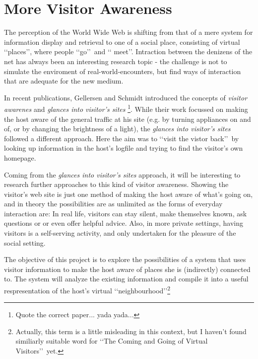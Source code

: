 \documentclass[a4paper]{danarticle}
\begin{document}
  \section*{More Visitor Awareness}
    The perception of the World Wide Web is shifting from that of a mere system
    for information display and retrieval to one of a social place, consisting
    of virtual \lq\lq places\rq\rq , where people \lq\lq go\rq\rq\ and \lq\lq
    meet\rq\rq . Intraction between the denizens of the net has always been an
    interesting research topic - the challenge is not to simulate the enviroment
    of real-world-encounters, but find ways of interaction that are adequate for
    the new medium.
    
    In recent publications, Gellersen and Schmidt introduced the concepts of
    \textit{visitor awarenes} and \textit{glances into visitor's sites}
    \footnote{Quote the correct paper... yada yada...}. While their work
    focussed on making the host aware of the general traffic at his site (e.g.
    by turning appliances on and of, or by changing the brightness of a light),
    the \textit{glances into visitor's sites} followed a different approach.
    Here the aim was to \lq\lq visit the vistor back\rq\rq\ by looking up
    information in the host's logfile and trying to find the visitor's own
    homepage.
    
    Coming from the \textit{glances into visitor's sites} approach, it will be
    interesting to research further approaches to this kind of visitor
    awareness. Showing the visitor's web site is just one method of making the
    host aware of what's going on, and in theory the possibilities are as unlimited
    as the forms of everyday interaction are: In real life, visitors can stay
    silent, make themselves known, ask questions or or even offer helpful
    advice. Also, in more private settings, having visitors is a self-serving
    activity, and only undertaken for the pleasure of the social setting.
    
    The objective of this project is to explore the possibilities of a system 
    that uses visitor information to make the host aware of places she is
    (indirectly) connected to. The system will analyze the existing information
    and compile it into a useful respresentation of the host's virtual 
    \lq\lq neighbourhood\rq\rq\footnote{Actually, this term is a little 
    misleading in this context, but I haven't found similiarly suitable 
    word for \lq\lq The Coming and Going of Virtual Visitors\rq\rq\ yet.}
    
\end{document}
